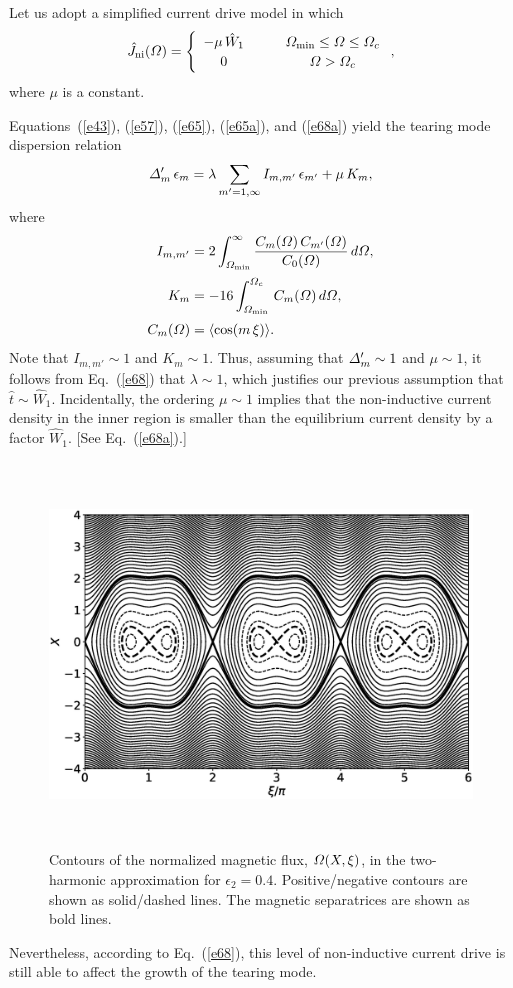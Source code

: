 \documentclass[12pt,prb,aps]{revtex4-1}
\begin{document}
Let us adopt a simplified current drive model in which 
\begin{equation}\label{e68a}
\hat{J}_{\rm ni}({\mit\Omega}) = \left\{
\begin{array}{ccc} -\mu\,\hat{W}_1&~~~&{\mit\Omega}_{\rm min}\leq {\mit\Omega} \leq {\mit\Omega}_c\\[0.5ex]
0&&{\mit\Omega}>{\mit\Omega}_c\end{array}\right.,
\end{equation}
where $\mu$ is a constant. 

Equations~(\ref{e43}), (\ref{e57}), (\ref{e65}), (\ref{e65a}), and (\ref{e68a}) yield the tearing mode dispersion relation
\begin{equation}\label{e68}
{\mit\Delta}_m'\,\epsilon_m = \lambda\sum_{m'=1,\infty}I_{m,m'}\,\epsilon_{m'} + \mu\,K_m,
\end{equation}
where 
\begin{align}
I_{m,m' } &= 2\int_{{\mit\Omega}_{\rm min}}^\infty\frac{C_m({\mit\Omega})\,C_{m'}({\mit\Omega})}{C_0({\mit\Omega})}\,d{\mit\Omega},\\[0.5ex]
K_m &= -16\int_{{\mit\Omega}_{\rm min}}^{\mit\Omega_c}\,C_m({\mit\Omega})
\,d{\mit\Omega},\label{e70}\\[0.5ex]
C_m({\mit\Omega})& = \langle\cos(m\,\xi)\rangle.\label{e72}
\end{align}
Note  that $I_{m,m'}\sim 1$ and $K_m\sim 1$. Thus, assuming
that ${\mit\Delta}_m'\sim 1$ and $\mu\sim 1$, it follows from Eq.~(\ref{e68}) that $\lambda\sim 1$, which justifies our previous assumption that $\hat{t}\sim \hat{W}_1$. Incidentally, the ordering  $\mu\sim 1$ implies that the
non-inductive current density in the inner region is smaller than the equilibrium current density by a factor $\hat{W}_1$.
[See Eq.~(\ref{e68a}).]
\begin{figure}
\centerline{\includegraphics[height=4in]{Figure3.eps}}
\caption{Contours of the normalized magnetic flux, ${\mit\Omega}(X,\xi)$, in the two-harmonic approximation for 
$\epsilon_2=0.4$. Positive/negative contours are shown as solid/dashed lines. The magnetic separatrices are shown
as  bold lines.}\label{fig3}
\end{figure}Nevertheless, according to Eq.~(\ref{e68}), this level of non-inductive current drive is still able to affect the growth of the tearing mode. 
\end{document}
